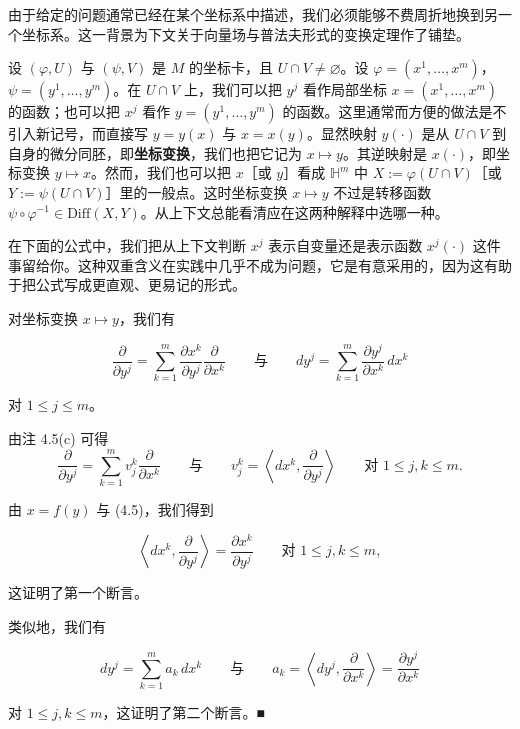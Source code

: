 由于给定的问题通常已经在某个坐标系中描述，我们必须能够不费周折地换到另一个坐标系。这一背景为下文关于向量场与普法夫形式的变换定理作了铺垫。

设 $ (\varphi, U) $ 与 $ (\psi, V) $ 是 $ M $ 的坐标卡，且 $ U\cap V\neq\varnothing $。设 $ \varphi = (x^{1}, \ldots, x^{m}) $，$ \psi = (y^{1}, \ldots, y^{m}) $。在 $ U\cap V $ 上，我们可以把 $ y^{j} $ 看作局部坐标 $ x = (x^{1}, \ldots, x^{m}) $ 的函数；也可以把 $ x^{j} $ 看作 $ y = (y^{1}, \ldots, y^{m}) $ 的函数。这里通常而方便的做法是不引入新记号，而直接写 $ y = y(x) $ 与 $ x = x(y) $。显然映射 $ y(\cdot) $ 是从 $ U\cap V $ 到自身的微分同胚，即\textbf{坐标变换}，我们也把它记为 $ x\mapsto y $。其逆映射是 $ x(\cdot) $，即坐标变换 $ y\mapsto x $。然而，我们也可以把 $ x $［或 $ y $］看成 $ \mathbb{H}^{m} $ 中 $ X := \varphi(U\cap V) $［或 $ Y := \psi(U\cap V) $］里的一般点。这时坐标变换 $ x\mapsto y $ 不过是转移函数 $ \psi\circ\varphi^{-1}\in\mathrm{Diff}(X,Y) $。从上下文总能看清应在这两种解释中选哪一种。

在下面的公式中，我们把从上下文判断 $ x^{j} $ 表示自变量还是表示函数 $ x^{j}(\cdot) $ 这件事留给你。这种双重含义在实践中几乎不成为问题，它是有意采用的，因为这有助于把公式写成更直观、更易记的形式。

\begin{proposition}

对坐标变换 $ x\mapsto y $，我们有

\[
\frac{\partial}{\partial y^{j}} = \sum_{k=1}^{m}\frac{\partial x^{k}}{\partial y^{j}}\frac{\partial}{\partial x^{k}} \qquad \text{与} \qquad dy^{j} = \sum_{k=1}^{m}\frac{\partial y^{j}}{\partial x^{k}}\,dx^{k}
\]

对 $ 1\le j\le m $。

\proofhead
由注 4.5(c) 可得
\[
\frac{\partial}{\partial y^{j}} = \sum_{k=1}^{m} v_{j}^{k}\frac{\partial}{\partial x^{k}} \qquad \text{与} \qquad v_{j}^{k} = \left\langle dx^{k}, \frac{\partial}{\partial y^{j}} \right\rangle \qquad \text{对 } 1\le j, k\le m .
\]

由 $ x = f(y) $ 与 (4.5)，我们得到

\begin{equation}
\left\langle dx^{k}, \frac{\partial}{\partial y^{j}} \right\rangle = \frac{\partial x^{k}}{\partial y^{j}} \qquad \text{对 } 1\le j, k\le m ,\tag{4.17}
\end{equation}

这证明了第一个断言。

类似地，我们有

\[
dy^{j} = \sum_{k=1}^{m} a_{k}\,dx^{k} \qquad \text{与} \qquad a_{k} = \left\langle dy^{j}, \frac{\partial}{\partial x^{k}} \right\rangle = \frac{\partial y^{j}}{\partial x^{k}}
\]

对 $ 1\le j, k\le m $，这证明了第二个断言。\nobreak\hspace{0.35em}■

\end{proposition}

